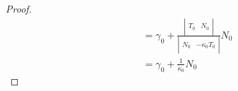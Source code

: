 \documentclass[10pt,a4paper]{article}
\begin{document}
\begin{proof}
\begin{align}
&= \gamma_0 + \frac{\left|\begin{array}{cc}\ &\ \\ T_0&N_0\\\ &\ \end{array}\right|}{\left|\begin{array}{cc}\ &\ \\ N_0& -\kappa_0T_0\\\ &\ \end{array}\right|} N_0\\
&= \gamma_0 + \frac{1}{\kappa_0} N_0
\end{align}
\end{proof}
\end{document}
